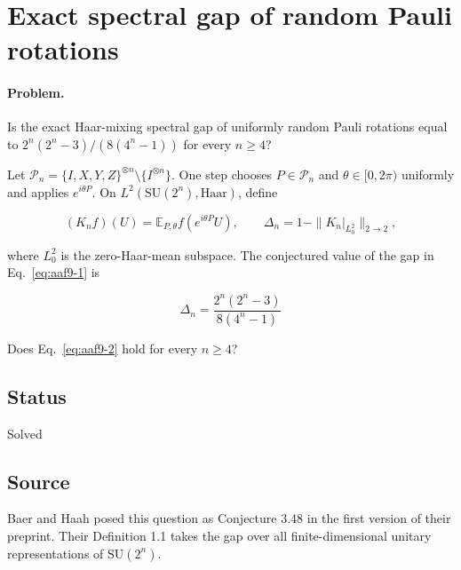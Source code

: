 \section{Exact spectral gap of random Pauli rotations}
\label{sec:op_aaf9791beced84e4}

\paragraph{Problem.}
Is the exact Haar-mixing spectral gap of uniformly random Pauli rotations equal to $2^n(2^n-3)/(8(4^n-1))$ for every $n\geq4$?

Let $\mathcal P_n=\{I,X,Y,Z\}^{\otimes n}\setminus\{I^{\otimes n}\}$. One step chooses $P\in\mathcal P_n$ and $\theta\in[0,2\pi)$ uniformly and applies $e^{i\theta P}$. On $L^2(\mathrm{SU}(2^n),\mathrm{Haar})$, define

\begin{equation}
(K_nf)(U)=\mathbb E_{P,\theta}f(e^{i\theta P}U),
\qquad
\Delta_n=1-\|K_n|_{L^2_0}\|_{2\to2},
\label{eq:aaf9-1}
\end{equation}

where $L^2_0$ is the zero-Haar-mean subspace. The conjectured value of the gap in Eq.~\eqref{eq:aaf9-1} is

\begin{equation}
\Delta_n=\frac{2^n(2^n-3)}{8(4^n-1)}
\label{eq:aaf9-2}
\end{equation}

Does Eq.~\eqref{eq:aaf9-2} hold for every $n\geq4$?

\subsection*{Status}

Solved

\subsection*{Source}

Baer and Haah posed this question as Conjecture 3.48 in the first version of their preprint. Their Definition 1.1 takes the gap over all finite-dimensional unitary representations of $\mathrm{SU}(2^n)$. 

